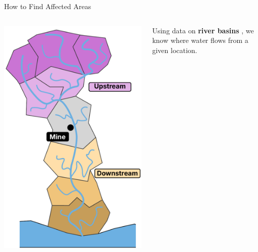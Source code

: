 \documentclass[aspectratio=169,11pt,dvipsnames, handout]{beamer}
\begin{document}
\begin{frame}{How to Find Affected Areas}
\label{frame:intro}
    \begin{columns}
        \begin{column}{0.35\linewidth}
            \includegraphics[height=0.9\paperheight]{img/basins.pdf}
        \end{column}
        \begin{column}{0.65\linewidth}
            Using data on \textbf{river basins} \parencite{lehner2013}, we know where water flows from a given location.

            \vspace{1em}
            

\end{column}
\end{columns}
\end{frame}
\end{document}
